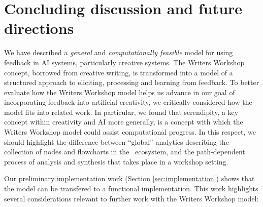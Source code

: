 \section{Concluding discussion and future directions}

 We have described a \emph{general} and \emph{computationally
   feasible} model for using feedback in AI systems, particularly
 creative systems.  The Writers Workshop concept, borrowed from
 creative writing, is transformed into a model of a structured
 approach to eliciting, processing and learning from feedback.  To
 better evaluate how the Writers Workshop model helps us advance in
 our goal of incorporating feedback into artificial creativity, we
 critically considered how the model fits into related work. In
 particular, we found that serendipity, a key concept within
 creativity and AI more generally, is a concept with which the Writers
 Workshop model could assist computational progress.
In this respect, we should highlight the difference between
``global'' analytics describing the collection of nodes and
flowcharts in the \Fw\ ecosystem, and the path-dependent
process of analysis and synthesis that takes place in a workshop setting.

Our preliminary implementation work (Section \ref{sec:implementation}) shows
that the model can be transfered to a functional implementation.  This
work highlights several considerations relevant to further work with
the Writers Workshop model:

